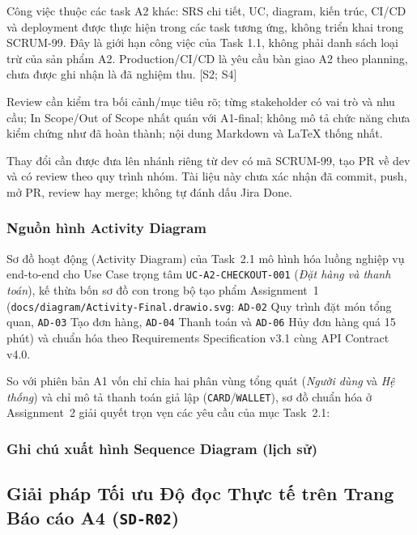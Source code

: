 Công việc thuộc các task A2 khác: SRS chi tiết, UC, diagram, kiến trúc, CI/CD và deployment được thực hiện trong các task tương ứng, không triển khai trong SCRUM-99. Đây là giới hạn công việc của Task 1.1, không phải danh sách loại trừ của sản phẩm A2. Production/CI/CD là yêu cầu bàn giao A2 theo planning, chưa được ghi nhận là đã nghiệm thu. [S2; S4]
\par

Review cần kiểm tra bối cảnh/mục tiêu rõ; từng stakeholder có vai trò và nhu cầu; In Scope/Out of Scope nhất quán với A1-final; không mô tả chức năng chưa kiểm chứng như đã hoàn thành; nội dung Markdown và LaTeX thống nhất.
\par

Thay đổi cần được đưa lên nhánh riêng từ dev có mã SCRUM-99, tạo PR về dev và có review theo quy trình nhóm. Tài liệu này chưa xác nhận đã commit, push, mở PR, review hay merge; không tự đánh dấu Jira Done.
\par


\subsubsection{Nguồn hình Activity Diagram}
Sơ đồ hoạt động (Activity Diagram) của Task~2.1 mô hình hóa luồng nghiệp vụ end-to-end cho Use Case trọng tâm \texttt{UC-A2-CHECKOUT-001} (\emph{Đặt hàng và thanh toán}), kế thừa bốn sơ đồ con trong bộ tạo phẩm Assignment~1 (\texttt{docs/diagram/Activity-Final.drawio.svg}: \texttt{AD-02} Quy trình đặt món tổng quan, \texttt{AD-03} Tạo đơn hàng, \texttt{AD-04} Thanh toán và \texttt{AD-06} Hủy đơn hàng quá 15 phút) và chuẩn hóa theo Requirements Specification v3.1 cùng API Contract v4.0.
\par

So với phiên bản A1 vốn chỉ chia hai phân vùng tổng quát (\emph{Người dùng} và \emph{Hệ thống}) và chỉ mô tả thanh toán giả lập (\texttt{CARD}/\texttt{WALLET}), sơ đồ chuẩn hóa ở Assignment~2 giải quyết trọn vẹn các yêu cầu của mục Task~2.1:

\subsubsection{Ghi chú xuất hình Sequence Diagram (lịch sử)}
\subsection{Giải pháp Tối ưu Độ đọc Thực tế trên Trang Báo cáo A4 (\texttt{SD-R02})}

